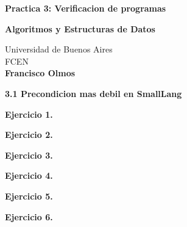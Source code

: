 \documentclass[12pt]{report}
\begin{document}
\begin{titlepage}
    \begin{center}
        \vspace*{1cm}
        
        \Huge
        \textbf{Practica 3: Verificacion de programas}
        \vspace{0.5cm}
        \LARGE

        \vfill
        \textbf{Algoritmos y Estructuras de Datos}
        

        
        \vfill

        
        \vspace{0.8cm}
        
        \Large
        Universidad de Buenos Aires \\
        FCEN \\
        \textbf{Francisco Olmos}
        
    \end{center}
\end{titlepage}


\textbf{3.1 Precondicion mas debil en SmallLang}

\vspace{0.8cm}
\textbf{Ejercicio 1.} 
\vspace{0.8cm}

\vspace{0.8cm}
\textbf{Ejercicio 2.} 
\vspace{0.8cm}

\vspace{0.8cm}
\textbf{Ejercicio 3.} 
\vspace{0.8cm}

\vspace{0.8cm}
\textbf{Ejercicio 4.} 
\vspace{0.8cm}

\vspace{0.8cm}
\textbf{Ejercicio 5.} 
\vspace{0.8cm}

\vspace{0.8cm}
\textbf{Ejercicio 6.} 
\vspace{0.8cm}
\end{document}
